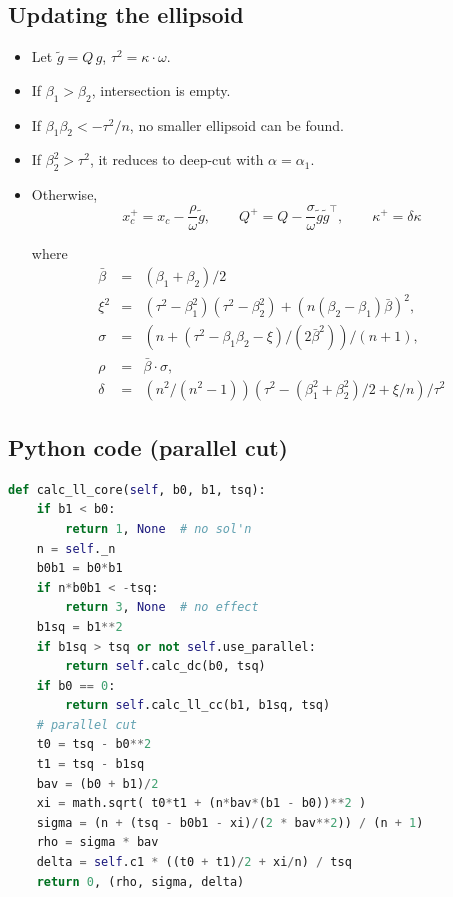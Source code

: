 \documentclass[]{article}
\begin{document}
\hypertarget{updating-the-ellipsoid}{%
\subsection{Updating the ellipsoid}\label{updating-the-ellipsoid}}

\begin{itemize}
\item
  Let \(\tilde{g} = Q\,g\), \(\tau^2 = \kappa\cdot\omega\).
\item
  If \(\beta_1 > \beta_2\), intersection is empty.
\item
  If \(\beta_1 \beta_2 < -\tau^2/n\), no smaller ellipsoid can be found.
\item
  If \(\beta_2^2 > \tau^2\), it reduces to deep-cut with
  \(\alpha = \alpha_1\).
\item
  Otherwise, \[x_c^+ = x_c - \frac{\rho}{\omega} \tilde{g}, \qquad
  Q^+ = Q - \frac{\sigma}{\omega} \tilde{g}\tilde{g}^\top, \qquad
  \kappa^+ =  \delta \kappa
   \]

  where \[\begin{array}{lll}
    \bar{\beta} &=& (\beta_1 + \beta_2)/2 \\
    \xi^2 &=& (\tau^2 - \beta_1^2)(\tau^2 - \beta_2^2) + (n(\beta_2 - \beta_1)\bar{\beta})^2, \\
    \sigma &=& (n + (\tau^2 - \beta_1\beta_2 - \xi)/(2\bar{\beta}^2)) / (n + 1), \\
    \rho &=& \bar{\beta}\cdot\sigma, \\
    \delta &=& (n^2/(n^2-1)) (\tau^2 - (\beta_1^2 + \beta_2^2)/2 + \xi/n) / \tau^2
   \end{array}\]
\end{itemize}

\hypertarget{python-code-parallel-cut}{%
\subsection{Python code (parallel cut)}\label{python-code-parallel-cut}}

\scriptsize

\begin{lstlisting}[language=Python]
def calc_ll_core(self, b0, b1, tsq):
    if b1 < b0:
        return 1, None  # no sol'n
    n = self._n
    b0b1 = b0*b1
    if n*b0b1 < -tsq:
        return 3, None  # no effect
    b1sq = b1**2
    if b1sq > tsq or not self.use_parallel:
        return self.calc_dc(b0, tsq)
    if b0 == 0:
        return self.calc_ll_cc(b1, b1sq, tsq)
    # parallel cut
    t0 = tsq - b0**2
    t1 = tsq - b1sq
    bav = (b0 + b1)/2
    xi = math.sqrt( t0*t1 + (n*bav*(b1 - b0))**2 )
    sigma = (n + (tsq - b0b1 - xi)/(2 * bav**2)) / (n + 1)
    rho = sigma * bav
    delta = self.c1 * ((t0 + t1)/2 + xi/n) / tsq
    return 0, (rho, sigma, delta)
\end{lstlisting}
\end{document}
